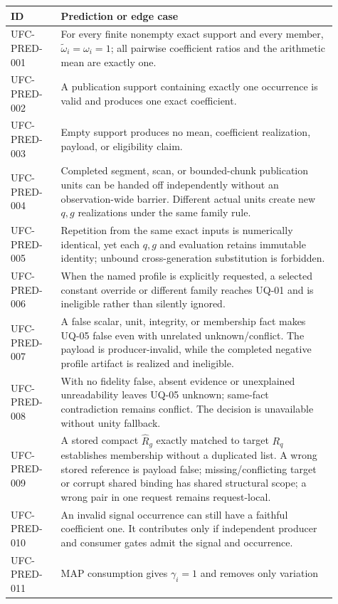 \begin{longtable}{p{0.14\linewidth}p{0.77\linewidth}}
\toprule
ID & Prediction or edge case\\
\midrule
\endhead
UFC-PRED-001 & For every finite nonempty exact support and every member,
\(\widetilde\omega_i=\omega_i=1\); all pairwise coefficient ratios and the
arithmetic mean are exactly one.\\
UFC-PRED-002 & A publication support containing exactly one occurrence is
valid and produces one exact coefficient.\\
UFC-PRED-003 & Empty support produces no mean, coefficient realization,
payload, or eligibility claim.\\
UFC-PRED-004 & Completed segment, scan, or bounded-chunk publication units can
be handed off independently without an observation-wide barrier. Different
actual units create new \(q,g\) realizations under the same family rule.\\
UFC-PRED-005 & Repetition from the same exact inputs is numerically identical,
yet each \(q,g\) and evaluation retains immutable identity; unbound
cross-generation substitution is forbidden.\\
UFC-PRED-006 & When the named profile is explicitly requested, a selected
constant override or different family reaches UQ-01 and is ineligible rather
than silently ignored.\\
UFC-PRED-007 & A false scalar, unit, integrity, or membership fact makes
UQ-05 false even with unrelated unknown/conflict. The payload is
producer-invalid, while the completed negative profile artifact is realized
and ineligible.\\
UFC-PRED-008 & With no fidelity false, absent evidence or unexplained
unreadability leaves UQ-05 unknown; same-fact contradiction remains conflict.
The decision is unavailable without unity fallback.\\
UFC-PRED-009 & A stored compact \(\widehat R_g\) exactly matched to target
\(R_q\) establishes membership without a duplicated list. A wrong stored
reference is payload false; missing/conflicting target or corrupt shared
binding has shared structural scope; a wrong pair in one request remains
request-local.\\
UFC-PRED-010 & An invalid signal occurrence can still have a faithful
coefficient one. It contributes only if independent producer and consumer
gates admit the signal and occurrence.\\
UFC-PRED-011 & MAP consumption gives \(\gamma_i=1\) and removes only variation

\end{longtable}

